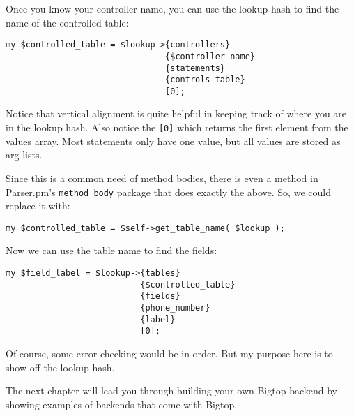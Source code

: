 Once you know your controller name, you can use the lookup hash to find the
name of the controlled table:

\begin{verbatim}
my $controlled_table = $lookup->{controllers}
                                {$controller_name}
                                {statements}
                                {controls_table}
                                [0];
\end{verbatim}

Notice that vertical alignment is quite helpful in keeping track of where
you are in the lookup hash.  Also notice the \verb+[0]+ which returns
the first element from the values array.  Most statements only have
one value, but all values are stored as arg lists.

Since this is a common need of method bodies, there is even a method
in Parser.pm's \verb+method_body+ package that does exactly the above.
So, we could replace it with:

\begin{verbatim}
my $controlled_table = $self->get_table_name( $lookup );
\end{verbatim}

Now we can use the table name to find the fields:

\begin{verbatim}
my $field_label = $lookup->{tables}
                           {$controlled_table}
                           {fields}
                           {phone_number}
                           {label}
                           [0];
\end{verbatim}

Of course, some error checking would be in order.  But my purpose here
is to show off the lookup hash.

The next chapter will lead you through building your own Bigtop backend
by showing examples of backends that come with Bigtop.
